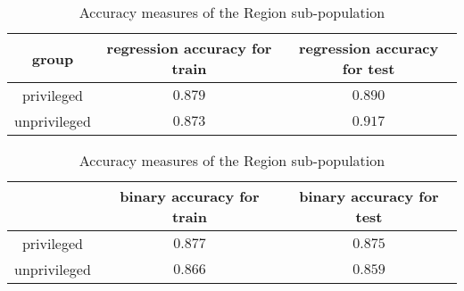 \documentclass[10pt]{article}
\begin{document}
\begin{table}[h!]
    \centering
    \begin{tabular}{c|c|c}
         group & regression accuracy for train& regression accuracy for test\\
         \hline
         \hline
         privileged & \(0.879\) & \(0.890\)\\
         \hline
         unprivileged & \(0.873\) & \(0.917\)
    \end{tabular}
    \vspace{3pt}
    \begin{tabular}{c|c|c}
          & \hphantom{re}binary accuracy for train\hphantom{re}& \hphantom{re}binary accuracy for test\hphantom{re}\\
         \hline
         \hline
         privileged & \(0.877\) & \(0.875\)\\
         \hline
         unprivileged & \(0.866\) & \(0.859\)
    \end{tabular}
    \vspace{3pt}
    \caption{Accuracy measures of the Region sub-population}
    \label{tab:acc_region}
\end{table}


\FloatBarrier
\end{document}
